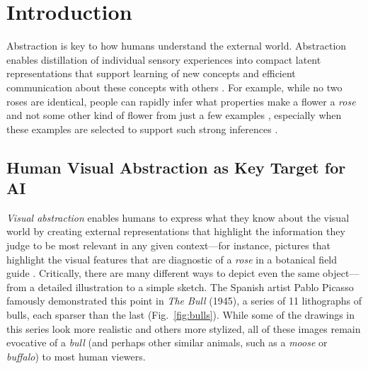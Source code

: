 \documentclass{article}
\begin{document}
\section{Introduction}


Abstraction is key to how humans understand the external world. 
Abstraction enables distillation of individual sensory experiences into compact latent representations that support learning of new concepts \cite{smith2002object, kemp2007learning, murphy2004big, goldstone2013concepts} and efficient communication about these concepts with others \cite{fan2020pragmatic, tessler2019language, hawkins2023visual, gentner2017analogy}.
For example, while no two roses are identical, people can rapidly infer what properties make a flower a \textit{rose} and not some other kind of flower from just a few examples \cite{xu2007word, lake2020people}, especially when these examples are selected to support such strong inferences \cite{gweon2010infants, shafto2014rational}.

\subsection{Human Visual Abstraction as Key Target for AI}
\textit{Visual abstraction} enables humans to express what they know about the visual world by creating external representations that highlight the information they judge to be most relevant in any given context---for instance, pictures that highlight the visual features that are diagnostic of a \textit{rose} in a botanical field guide \cite{fan2018common, fan2020pragmatic, viola2017pondering}. 
Critically, there are many different ways to depict even the same object---from a detailed illustration to a simple sketch. 
The Spanish artist Pablo Picasso famously demonstrated this point in \textit{The Bull} (1945), a series of 11 lithographs of bulls, each sparser than the last (Fig.~\ref{fig:bulls}).
While some of the drawings in this series look more realistic and others more stylized, all of these images remain evocative of a \textit{bull} (and perhaps other similar animals, such as a \textit{moose} or \textit{buffalo}) to most human viewers.
\end{document}
